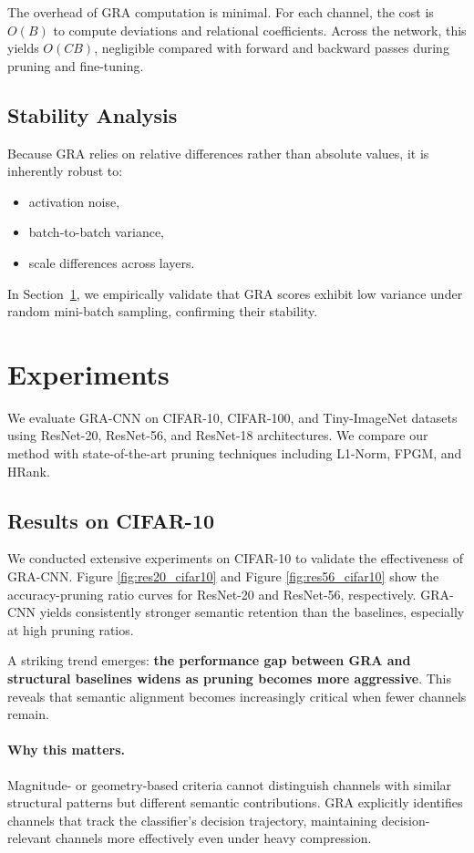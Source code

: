 \documentclass[sn-mathphys,Numbered]{sn-jnl}
\begin{document}
The overhead of GRA computation is minimal. For each channel, the cost is $O(B)$ to compute deviations and relational coefficients. Across the network, this yields $O(CB)$, negligible compared with forward and backward passes during pruning and fine-tuning.

\subsection{Stability Analysis}

Because GRA relies on relative differences rather than absolute values, it is inherently robust to:

\begin{itemize}
    \item activation noise,  
    \item batch-to-batch variance,  
    \item scale differences across layers.
\end{itemize}

In Section~\ref{sec:experiments}, we empirically validate that GRA scores exhibit low variance under random mini-batch sampling, confirming their stability.

\section{Experiments}
\label{sec:experiments}
We evaluate GRA-CNN on CIFAR-10, CIFAR-100, and Tiny-ImageNet datasets using ResNet-20, ResNet-56, and ResNet-18 architectures. We compare our method with state-of-the-art pruning techniques including L1-Norm, FPGM, and HRank.

\subsection{Results on CIFAR-10}
We conducted extensive experiments on CIFAR-10 to validate the effectiveness of GRA-CNN. Figure \ref{fig:res20_cifar10} and Figure \ref{fig:res56_cifar10} show the accuracy-pruning ratio curves for ResNet-20 and ResNet-56, respectively. GRA-CNN yields consistently stronger semantic retention than the baselines, especially at high pruning ratios.

A striking trend emerges:
\textbf{the performance gap between GRA and structural baselines widens as pruning becomes more aggressive}.
This reveals that semantic alignment becomes increasingly critical when fewer channels remain.

\paragraph{Why this matters.}
Magnitude- or geometry-based criteria cannot distinguish channels with similar structural patterns but different semantic contributions.
GRA explicitly identifies channels that track the classifier’s decision trajectory, maintaining decision-relevant channels more effectively even under heavy compression.
\end{document}
